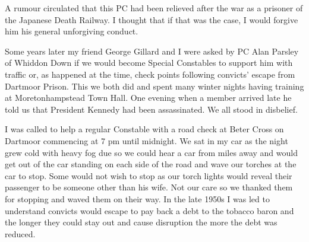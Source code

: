 A rumour circulated that this PC had been relieved after the war as a prisoner
of the Japanese Death Railway. I thought that if that was the case, I would
forgive him his general unforgiving conduct.

Some years later my friend George Gillard and I were asked by PC Alan Parsley of
Whiddon Down if we would become Special Constables to support him with traffic
or, as happened at the time, check points following convicts' escape from
Dartmoor Prison. This we both did and spent many winter nights having
training at Moretonhampstead Town Hall. One evening when a member arrived late
he told us that President Kennedy had been assassinated. We all stood in
disbelief.

I was called to help a regular Constable with a road check at Beter Cross on
Dartmoor commencing at 7 pm until midnight. We sat in my car as the night grew
cold with heavy fog due so we could hear a car from miles away and would get
out of the car standing on each side of the road and wave our torches at the
car to stop. Some would not wish to stop as our torch lights would reveal
their passenger to be someone other than his wife. Not our care so we thanked
them for stopping and waved them on their way. In the late 1950s I was led to
understand convicts would escape to pay back a debt to the tobacco baron and
the longer they could stay out and cause disruption the more the debt was
reduced.